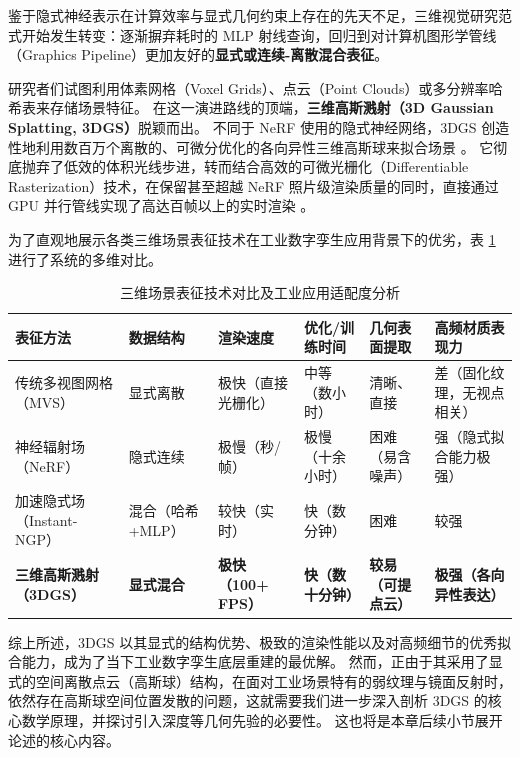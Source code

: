 鉴于隐式神经表示在计算效率与显式几何约束上存在的先天不足，三维视觉研究范式开始发生转变：逐渐摒弃耗时的 MLP 射线查询，回归到对计算机图形学管线（Graphics Pipeline）更加友好的\textbf{显式或连续-离散混合表征}。

研究者们试图利用体素网格（Voxel Grids）、点云（Point Clouds）或多分辨率哈希表来存储场景特征。
在这一演进路线的顶端，\textbf{三维高斯溅射（3D Gaussian Splatting, 3DGS）}脱颖而出。
不同于 NeRF 使用的隐式神经网络，3DGS 创造性地利用数百万个离散的、可微分优化的各向异性三维高斯球来拟合场景 。
它彻底抛弃了低效的体积光线步进，转而结合高效的可微光栅化（Differentiable Rasterization）技术，在保留甚至超越 NeRF 照片级渲染质量的同时，直接通过 GPU 并行管线实现了高达百帧以上的实时渲染 。

为了直观地展示各类三维场景表征技术在工业数字孪生应用背景下的优劣，表 \ref{tab:representation_comparison} 进行了系统的多维对比。

\begin{table}[htbp]
    \centering
    \caption{三维场景表征技术对比及工业应用适配度分析}
    \label{tab:representation_comparison}
    \renewcommand{\arraystretch}{1.3}
    \setlength{\tabcolsep}{4pt}
    \begin{tabularx}{\textwidth}{p{2.8cm} >{\centering\arraybackslash}X >{\centering\arraybackslash}X >{\centering\arraybackslash}X >{\centering\arraybackslash}X >{\centering\arraybackslash}X}
        \toprule
        \textbf{表征方法} & \textbf{数据结构} & \textbf{渲染速度} & \textbf{优化/训练时间} & \textbf{几何表面提取} & \textbf{高频材质表现力} \\
        \midrule
        传统多视图网格（MVS） & 显式离散 & 极快（直接光栅化） & 中等（数小时） & 清晰、直接 & 差（固化纹理，无视点相关） \\
        神经辐射场（NeRF） & 隐式连续 & 极慢（秒/帧） & 极慢（十余小时） & 困难（易含噪声） & 强（隐式拟合能力极强） \\
        加速隐式场（Instant-NGP） & 混合（哈希+MLP） & 较快（实时） & 快（数分钟） & 困难 & 较强 \\
        \textbf{三维高斯溅射（3DGS）} & \textbf{显式混合} & \textbf{极快（100+ FPS）} & \textbf{快（数十分钟）} & \textbf{较易（可提点云）} & \textbf{极强（各向异性表达）} \\
        \bottomrule
    \end{tabularx}
\end{table}

综上所述，3DGS 以其显式的结构优势、极致的渲染性能以及对高频细节的优秀拟合能力，成为了当下工业数字孪生底层重建的最优解。
然而，正由于其采用了显式的空间离散点云（高斯球）结构，在面对工业场景特有的弱纹理与镜面反射时，依然存在高斯球空间位置发散的问题，这就需要我们进一步深入剖析 3DGS 的核心数学原理，并探讨引入深度等几何先验的必要性。
这也将是本章后续小节展开论述的核心内容。


